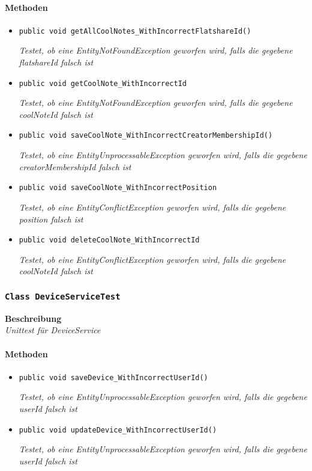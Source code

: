 \paragraph*{Methoden}
\begin{itemize}
      	\item{\texttt{public void getAllCoolNotes\_WithIncorrectFlatshareId()}}
      	
      	\textit{Testet, ob eine EntityNotFoundException geworfen wird, falls die gegebene flatshareId falsch ist}
      	
      	\item{\texttt{public void getCoolNote\_WithIncorrectId}}
      	
      	\textit{Testet, ob eine EntityNotFoundException geworfen wird, falls die gegebene coolNoteId falsch ist}
      	
      	\item{\texttt{public void saveCoolNote\_WithIncorrectCreatorMembershipId()}}
      	
      	\textit{Testet, ob eine EntityUnprocessableException geworfen wird, falls die gegebene creatorMembershipId falsch ist}
      	
      	\item{\texttt{public void saveCoolNote\_WithIncorrectPosition}}
      	
      	\textit{Testet, ob eine EntityConflictException geworfen wird, falls die gegebene position falsch ist}
      	
      	\item{\texttt{public void deleteCoolNote\_WithIncorrectId}}
      	
      	\textit{Testet, ob eine EntityConflictException geworfen wird, falls die gegebene coolNoteId falsch ist}
\end{itemize}

 \subsubsection{\texttt{Class DeviceServiceTest}}
 \textbf{Beschreibung} \\
 \textit{Unittest für DeviceService}
 \paragraph*{Methoden}
 \begin{itemize}
    	\item{\texttt{public void saveDevice\_WithIncorrectUserId()}}
    	
    	\textit{Testet, ob eine EntityUnprocessableException geworfen wird, falls die gegebene userId falsch ist}

    	\item{\texttt{public void updateDevice\_WithIncorrectUserId()}}
    	
    	\textit{Testet, ob eine EntityUnprocessableException geworfen wird, falls die gegebene userId falsch ist}
 \end{itemize}

